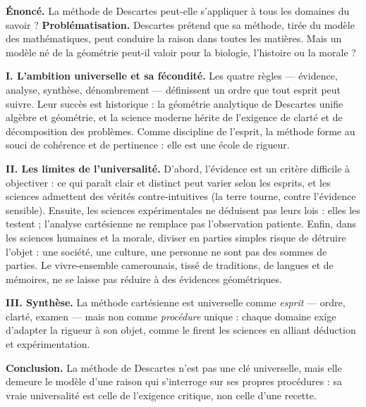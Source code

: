 \documentclass[11pt]{article}
\begin{document}
\begin{exoresolu}
\textbf{Énoncé.} La méthode de Descartes peut-elle s'appliquer à tous les domaines du savoir ?
\tcblower
\textbf{Problématisation.} Descartes prétend que sa méthode, tirée du modèle des mathématiques, peut conduire la raison dans toutes les matières. Mais un modèle né de la géométrie peut-il valoir pour la biologie, l'histoire ou la morale ?

\textbf{I. L'ambition universelle et sa fécondité.} Les quatre règles — évidence, analyse, synthèse, dénombrement — définissent un ordre que tout esprit peut suivre. Leur succès est historique : la géométrie analytique de Descartes unifie algèbre et géométrie, et la science moderne hérite de l'exigence de clarté et de décomposition des problèmes. Comme discipline de l'esprit, la méthode forme au souci de cohérence et de pertinence : elle est une école de rigueur.

\textbf{II. Les limites de l'universalité.} D'abord, l'évidence est un critère difficile à objectiver : ce qui paraît clair et distinct peut varier selon les esprits, et les sciences admettent des vérités contre-intuitives (la terre tourne, contre l'évidence sensible). Ensuite, les sciences expérimentales ne déduisent pas leurs lois : elles les testent ; l'analyse cartésienne ne remplace pas l'observation patiente. Enfin, dans les sciences humaines et la morale, diviser en parties simples risque de détruire l'objet : une société, une culture, une personne ne sont pas des sommes de parties. Le vivre-ensemble camerounais, tissé de traditions, de langues et de mémoires, ne se laisse pas réduire à des évidences géométriques.

\textbf{III. Synthèse.} La méthode cartésienne est universelle comme \emph{esprit} — ordre, clarté, examen — mais non comme \emph{procédure} unique : chaque domaine exige d'adapter la rigueur à son objet, comme le firent les sciences en alliant déduction et expérimentation.

\textbf{Conclusion.} La méthode de Descartes n'est pas une clé universelle, mais elle demeure le modèle d'une raison qui s'interroge sur ses propres procédures : sa vraie universalité est celle de l'exigence critique, non celle d'une recette.
\end{exoresolu}
\end{document}
